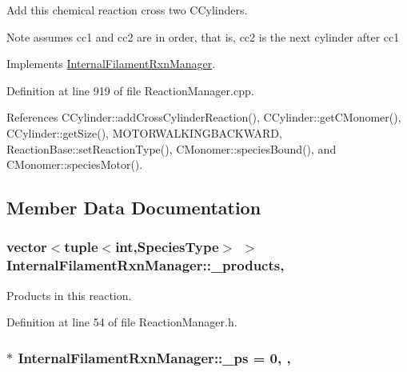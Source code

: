 Add this chemical reaction cross two C\+Cylinders. 

\begin{DoxyNote}{Note}
assumes cc1 and cc2 are in order, that is, cc2 is the next cylinder after cc1 
\end{DoxyNote}


Implements \hyperlink{classInternalFilamentRxnManager_ac8152bcd9f6aa5d69f85a98cff86d2b0}{Internal\+Filament\+Rxn\+Manager}.



Definition at line 919 of file Reaction\+Manager.\+cpp.



References C\+Cylinder\+::add\+Cross\+Cylinder\+Reaction(), C\+Cylinder\+::get\+C\+Monomer(), C\+Cylinder\+::get\+Size(), M\+O\+T\+O\+R\+W\+A\+L\+K\+I\+N\+G\+B\+A\+C\+K\+W\+A\+R\+D, Reaction\+Base\+::set\+Reaction\+Type(), C\+Monomer\+::species\+Bound(), and C\+Monomer\+::species\+Motor().



\subsection{Member Data Documentation}
\hypertarget{classInternalFilamentRxnManager_afd213da1a3706e2e88962e5da886a5dc}{
\subsubsection[{\+\_\+products}]{\setlength{\rightskip}{0pt plus 5cm}vector$<$tuple$<$int,{\bf Species\+Type}$>$ $>$ Internal\+Filament\+Rxn\+Manager\+::\+\_\+products\hspace{0.3cm}{\ttfamily [protected]}, {\ttfamily [inherited]}}}\label{classInternalFilamentRxnManager_afd213da1a3706e2e88962e5da886a5dc}


Products in this reaction. 



Definition at line 54 of file Reaction\+Manager.\+h.

\hypertarget{classInternalFilamentRxnManager_a973ce9cc2aae811e6867afa46193c5f2}{
\subsubsection[{\+\_\+ps}]{ $\ast$ Internal\+Filament\+Rxn\+Manager\+::\+\_\+ps = 0\hspace{0.3cm}{\ttfamily [static]}, {\ttfamily [protected]}, {\ttfamily [inherited]}}}\label{classInternalFilamentRxnManager_a973ce9cc2aae811e6867afa46193c5f2}



